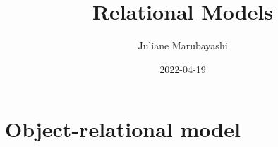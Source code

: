 \documentclass{article}
\title{Relational Models}
\author{Juliane Marubayashi}
\date{ 2022-04-19}
\begin{document}
 
    \maketitle 
    \newpage 
    \tableofcontents
    \newpage
    \section{Object-relational model}
     

    
\end{document}
